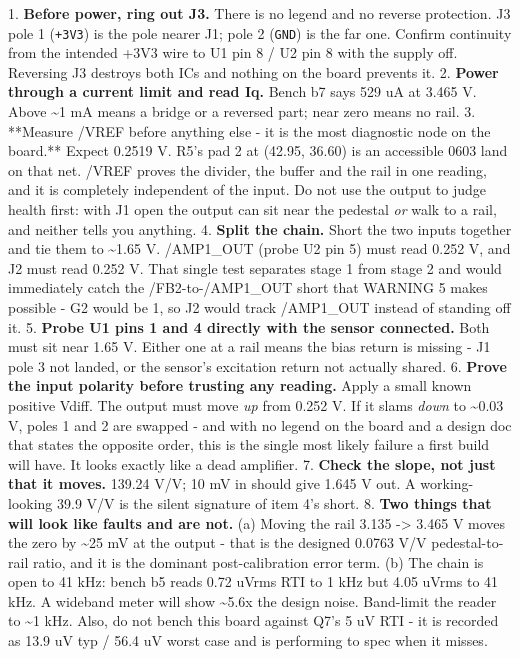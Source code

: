 \documentclass[11pt,a4paper]{article}
\begin{document}
1. \textbf{Before power, ring out J3.} There is no legend and no reverse protection. J3 pole 1 (\texttt{+3V3}) is the pole nearer J1; pole 2 (\texttt{GND}) is the far one. Confirm continuity from the intended +3V3 wire to U1 pin 8 / U2 pin 8 with the supply off. Reversing J3 destroys both ICs and nothing on the board prevents it. 2. \textbf{Power through a current limit and read Iq.} Bench b7 says 529 uA at 3.465 V. Above \textasciitilde{}1 mA means a bridge or a reversed part; near zero means no rail. 3. {*}{*}Measure /VREF before anything else - it is the most diagnostic node on the board.{*}{*} Expect 0.2519 V. R5's pad 2 at (42.95, 36.60) is an accessible 0603 land on that net. /VREF proves the divider, the buffer and the rail in one reading, and it is completely independent of the input. Do not use the output to judge health first: with J1 open the output can sit near the pedestal \emph{or} walk to a rail, and neither tells you anything. 4. \textbf{Split the chain.} Short the two inputs together and tie them to \textasciitilde{}1.65 V. /AMP1\_OUT (probe U2 pin 5) must read 0.252 V, and J2 must read 0.252 V. That single test separates stage 1 from stage 2 and would immediately catch the /FB2-to-/AMP1\_OUT short that WARNING 5 makes possible - G2 would be 1, so J2 would track /AMP1\_OUT instead of standing off it. 5. \textbf{Probe U1 pins 1 and 4 directly with the sensor connected.} Both must sit near 1.65 V. Either one at a rail means the bias return is missing - J1 pole 3 not landed, or the sensor's excitation return not actually shared. 6. \textbf{Prove the input polarity before trusting any reading.} Apply a small known positive Vdiff. The output must move \emph{up} from 0.252 V. If it slams \emph{down} to \textasciitilde{}0.03 V, poles 1 and 2 are swapped - and with no legend on the board and a design doc that states the opposite order, this is the single most likely failure a first build will have. It looks exactly like a dead amplifier. 7. \textbf{Check the slope, not just that it moves.} 139.24 V/V; 10 mV in should give 1.645 V out. A working-looking 39.9 V/V is the silent signature of item 4's short. 8. \textbf{Two things that will look like faults and are not.} (a) Moving the rail 3.135 -\textgreater{} 3.465 V moves the zero by \textasciitilde{}25 mV at the output - that is the designed 0.0763 V/V pedestal-to-rail ratio, and it is the dominant post-calibration error term. (b) The chain is open to 41 kHz: bench b5 reads 0.72 uVrms RTI to 1 kHz but 4.05 uVrms to 41 kHz. A wideband meter will show \textasciitilde{}5.6x the design noise. Band-limit the reader to \textasciitilde{}1 kHz. Also, do not bench this board against Q7's 5 uV RTI - it is recorded as 13.9 uV typ / 56.4 uV worst case and is performing to spec when it misses.
\end{document}

